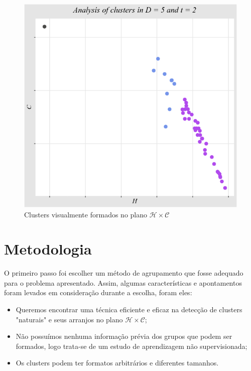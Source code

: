 \documentclass[12pt]{article}
\begin{document}
\begin{figure}[!h]
	\centering
	\includegraphics[scale = 0.6]{../../Images/Textures/cluters_textures.png} 
	\caption{Clusters visualmente formados no plano $\mathcal H\times \mathcal C$}
	\label{fig:clusters}
\end{figure}

\newpage

\section{Metodologia}

O primeiro passo foi escolher um método de agrupamento que fosse adequado para o problema apresentado. 
Assim, algumas características e apontamentos foram levados em consideração durante a escolha, foram eles:

\begin{itemize}
    \item Queremos encontrar uma técnica eficiente e eficaz na detecção de clusters "naturais" e seus arranjos no plano $\mathcal H\times \mathcal C$;
    \item Não possuímos nenhuma informação prévia dos grupos que podem ser formados, logo trata-se de um estudo de aprendizagem não supervisionada;
    \item Os clusters podem ter formatos arbitrários e diferentes tamanhos.
\end{itemize}
\end{document}
